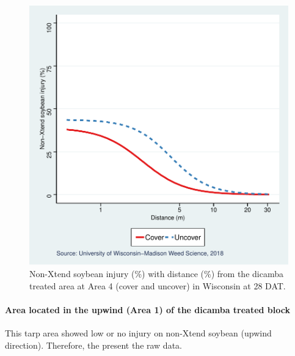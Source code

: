 \documentclass[]{article}
\let\oldparagraph\paragraph
\renewcommand{\paragraph}[1]{\oldparagraph{#1}\mbox{}}
\begin{document}
\begin{figure}
\centering
\includegraphics{Report_files/figure-latex/unnamed-chunk-106-1.pdf}
\caption{Non-Xtend soybean injury (\%) with distance (\%) from the
dicamba treated area at Area 4 (cover and uncover) in Wisconsin at 28
DAT.}
\end{figure}

\pagebreak

\paragraph{Area located in the upwind (Area 1) of the dicamba treated
block}\label{area-located-in-the-upwind-area-1-of-the-dicamba-treated-block}

This tarp area showed low or no injury on non-Xtend soybean (upwind
direction). Therefore, the present the raw data.
\end{document}
